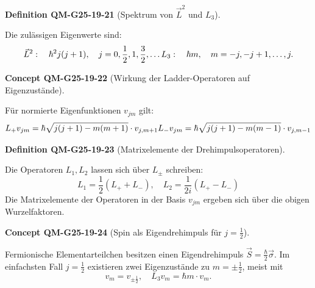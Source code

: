 \documentclass[10pt, letterpaper]{article}
\newcommand{\CustomHeading}[3]{%
  \par\medskip\noindent%
  \textbf{#1 #2} \textnormal{(#3)}.\enskip%
}
\newenvironment{DEF}[2]{\CustomHeading{Definition}{#1}{#2}}{}
\newenvironment{CONC}[2]{\CustomHeading{Concept}{#1}{#2}}{}
\begin{document}
\begin{DEF}{QM-G25-19-21}{Spektrum von \(\vec{L}^2\) und \(L_3\)}
Die zulässigen Eigenwerte sind:
$$
\vec{L}^2: \quad \hbar^2 j(j+1), \quad j = 0, \frac{1}{2}, 1, \frac{3}{2}, \dots \\
L_3: \quad \hbar m, \quad m = -j, -j+1, \dots, j.
$$
\end{DEF}

\begin{CONC}{QM-G25-19-22}{Wirkung der Ladder-Operatoren auf Eigenzustände}
Für normierte Eigenfunktionen \(v_{j m}\) gilt:
$$
L_+ v_{j m} = \hbar \sqrt{j(j+1) - m(m+1)} \cdot v_{j, m+1} \\
L_- v_{j m} = \hbar \sqrt{j(j+1) - m(m-1)} \cdot v_{j, m-1}
$$
\end{CONC}

\begin{DEF}{QM-G25-19-23}{Matrixelemente der Drehimpulsoperatoren}
Die Operatoren \(L_1, L_2\) lassen sich über \(L_\pm\) schreiben:
$$
L_1 = \frac{1}{2}(L_+ + L_-), \quad L_2 = \frac{1}{2i}(L_+ - L_-)
$$
Die Matrixelemente der Operatoren in der Basis \(v_{j m}\) ergeben sich über die obigen Wurzelfaktoren.
\end{DEF}

\begin{CONC}{QM-G25-19-24}{Spin als Eigendrehimpuls für \(j = \frac{1}{2}\)}
Fermionische Elementarteilchen besitzen einen Eigendrehimpuls \( \vec{S} = \frac{\hbar}{2} \vec{\sigma} \). Im einfachsten Fall \(j = \frac{1}{2}\) existieren zwei Eigenzustände zu \(m = \pm \frac{1}{2}\), meist mit
$$
v_{m} = v_{\pm \frac{1}{2}}, \quad L_3 v_m = \hbar m \cdot v_m.
$$
\end{CONC}
\end{document}
